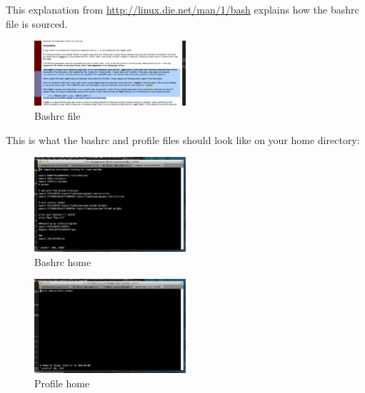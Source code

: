 \documentclass[letterpaper,10pt]{article}
\begin{document}
This explanation from \url{http://linux.die.net/man/1/bash} explains how the bashrc file is sourced. 

\begin{figure}[h!]
  \centering
  \includegraphics[width=0.5\textwidth]{images/bashrc_file}
  \caption{Bashrc file}
  \label{fig:bashrc_file}
\end{figure}

This is what the bashrc and profile files should look like on your home directory:

\begin{figure}[h!]
  \centering
  \includegraphics[width=0.5\textwidth]{images/bashrc_home}
  \caption{Bashrc home}
  \label{fig:bashrc_home}
\end{figure}

\begin{figure}[h!]
  \centering
  \includegraphics[width=0.5\textwidth]{images/profile_home}
  \caption{Profile home}
  \label{fig:profile_home}
\end{figure}


\end{document}
